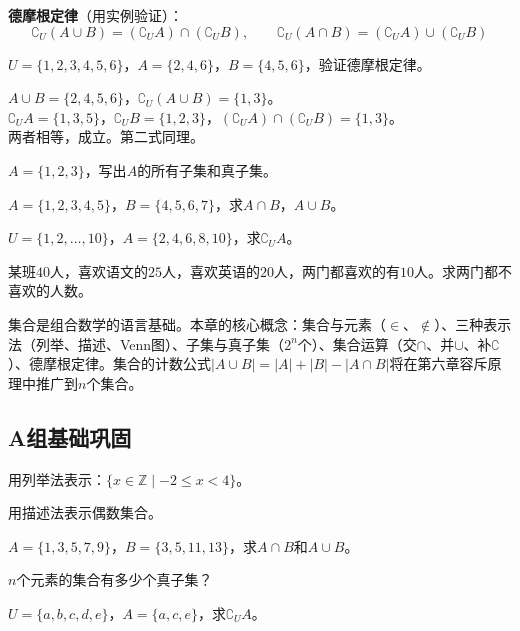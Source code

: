 \textbf{德摩根定律}（用实例验证）：
\[
\complement_U(A\cup B) = (\complement_UA) \cap (\complement_UB), \qquad
\complement_U(A\cap B) = (\complement_UA) \cup (\complement_UB)
\]

\begin{example}
$U=\{1,2,3,4,5,6\}$，$A=\{2,4,6\}$，$B=\{4,5,6\}$，验证德摩根定律。
\end{example}
\begin{solution}
$A\cup B=\{2,4,5,6\}$，$\complement_U(A\cup B)=\{1,3\}$。\\
$\complement_UA=\{1,3,5\}$，$\complement_UB=\{1,2,3\}$，$(\complement_UA)\cap(\complement_UB)=\{1,3\}$。\\
两者相等，成立。第二式同理。
\end{solution}

\begin{exercise}
\item $A=\{1,2,3\}$，写出$A$的所有子集和真子集。
\item $A=\{1,2,3,4,5\}$，$B=\{4,5,6,7\}$，求$A\cap B$，$A\cup B$。
\item $U=\{1,2,\dots,10\}$，$A=\{2,4,6,8,10\}$，求$\complement_UA$。
\item 某班$40$人，喜欢语文的$25$人，喜欢英语的$20$人，两门都喜欢的有$10$人。求两门都不喜欢的人数。
\end{exercise}


集合是组合数学的语言基础。本章的核心概念：集合与元素（$\in$、$\notin$）、三种表示法（列举、描述、Venn图）、子集与真子集（$2^n$个）、集合运算（交$\cap$、并$\cup$、补$\complement$）、德摩根定律。集合的计数公式$|A\cup B|=|A|+|B|-|A\cap B|$将在第六章容斥原理中推广到$n$个集合。


\subsection*{A组\quad 基础巩固}

\begin{exercise}
\item 用列举法表示：$\{x\in\mathbb Z\mid -2\le x<4\}$。
\item 用描述法表示偶数集合。
\item $A=\{1,3,5,7,9\}$，$B=\{3,5,11,13\}$，求$A\cap B$和$A\cup B$。
\item $n$个元素的集合有多少个真子集？
\item $U=\{a,b,c,d,e\}$，$A=\{a,c,e\}$，求$\complement_UA$。
\end{exercise}

